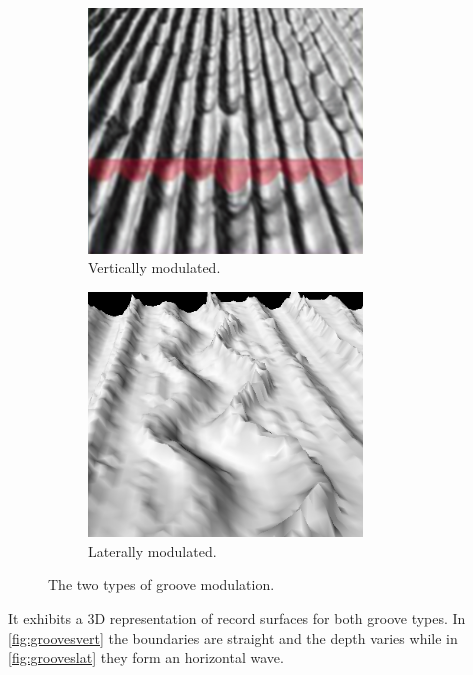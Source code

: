 \begin{figure}[!ht]
    \begin{subfigure}[b]{0.49\textwidth}
    \centering
    \includegraphics[width=0.8\textwidth]{images/grooves-vertical}
    \caption{Vertically modulated.}
    \label{fig:groovesvert}
    \end{subfigure}
    \begin{subfigure}[b]{0.49\textwidth}
    \centering
    \includegraphics[width=0.8\textwidth]{images/grooves-lateral}
    \caption{Laterally modulated.}
    \label{fig:grooveslat}
    \end{subfigure}
    \caption{The two types of groove modulation.}
    \label{fig:groovesdiff}
\end{figure}

It exhibits a 3D representation of record surfaces for both groove types. In \autoref{fig:groovesvert} the boundaries are straight and the depth varies while in \autoref{fig:grooveslat} they form an horizontal wave.

